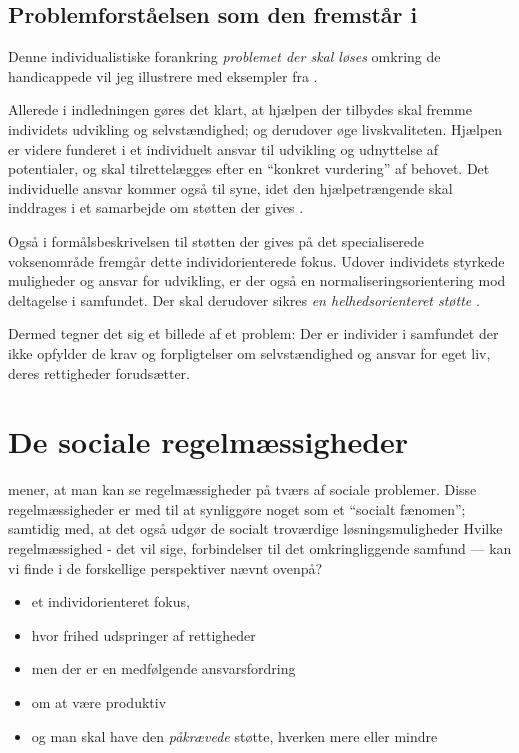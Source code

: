 \subsection{Problemforståelsen som den fremstår i }

 Denne individualistiske forankring \textit{problemet der skal løses} omkring de handicappede vil jeg illustrere med eksempler fra .

Allerede i indledningen gøres det klart, at hjælpen der tilbydes skal fremme individets udvikling og selvstændighed; og derudover øge livskvaliteten.
Hjælpen er videre funderet i et individuelt ansvar til udvikling og udnyttelse af potentialer, og skal tilrettelægges efter en “konkret vurdering” af behovet.
Det individuelle ansvar kommer også til syne, idet den hjælpetrængende skal inddrages i et samarbejde om støtten der gives \autocite[§§ 2-3]{social-ogindenrigsministerietBekendtgorelseAfLov2019}.

Også i formålsbeskrivelsen til støtten der gives på det specialiserede voksenområde fremgår  dette individorienterede fokus.
Udover individets styrkede muligheder og ansvar for udvikling, er der også en normaliseringsorientering mod deltagelse i samfundet.
Der skal derudover sikres \textit{en helhedsorienteret støtte} .

Dermed tegner det sig et billede af et problem: Der er individer i samfundet der ikke opfylder de krav og forpligtelser om selvstændighed og ansvar for eget liv, deres rettigheder forudsætter.

\section{De sociale regelmæssigheder}

\citeauthor{scheurichPolicyArchaeologyNew1994} mener, at man kan se regelmæssigheder på tværs af sociale problemer.
Disse regelmæssigheder er med til at synliggøre noget som et “socialt fænomen”; samtidig med, at det også udgør de socialt troværdige løsningsmuligheder \cite[s. 301]{scheurichPolicyArchaeologyNew1994}
Hvilke regelmæssighed - det vil sige, forbindelser til det omkringliggende samfund — kan vi finde i de forskellige perspektiver nævnt ovenpå?

\begin{itemize}
  \item
    et individorienteret fokus, 
  \item
    hvor frihed udspringer af rettigheder
  \item
    men der er en medfølgende ansvarsfordring
  \item
    om at være produktiv
  \item
    og man skal have den \textit{påkrævede} støtte, hverken mere eller mindre
\end{itemize}



